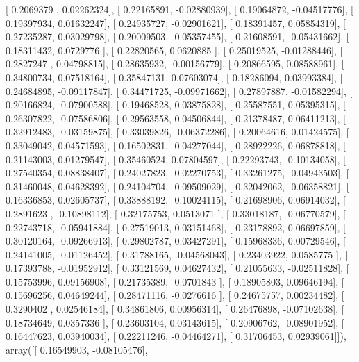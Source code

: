 \documentclass{article}
\begin{document}
       [ 0.2069379 ,  0.02262324],
       [ 0.22165891, -0.02880939],
       [ 0.19064872, -0.04517776],
       [ 0.19397934,  0.01632247],
       [ 0.24935727, -0.02901621],
       [ 0.18391457,  0.05854319],
       [ 0.27235287,  0.03029798],
       [ 0.20009503, -0.05357455],
       [ 0.21608591, -0.05431662],
       [ 0.18311432,  0.0729776 ],
       [ 0.22820565,  0.0620885 ],
       [ 0.25019525, -0.01288446],
       [ 0.2827247 ,  0.04798815],
       [ 0.28635932, -0.00156779],
       [ 0.20866595,  0.08588961],
       [ 0.34800734,  0.07518164],
       [ 0.35847131,  0.07603074],
       [ 0.18286094,  0.03993384],
       [ 0.24684895, -0.09117847],
       [ 0.34471725, -0.09971662],
       [ 0.27897887, -0.01582294],
       [ 0.20166824, -0.07900588],
       [ 0.19468528,  0.03875828],
       [ 0.25587551,  0.05395315],
       [ 0.26307822, -0.07586806],
       [ 0.29563558,  0.04506844],
       [ 0.21378487,  0.06411213],
       [ 0.32912483, -0.03159875],
       [ 0.33039826, -0.06372286],
       [ 0.20064616,  0.01424575],
       [ 0.33049042,  0.04571593],
       [ 0.16502831, -0.04277044],
       [ 0.28922226,  0.06878818],
       [ 0.21143003,  0.01279547],
       [ 0.35460524,  0.07804597],
       [ 0.22293743, -0.10134058],
       [ 0.27540354,  0.08838407],
       [ 0.24027823, -0.02270753],
       [ 0.33261275, -0.04943503],
       [ 0.31460048,  0.04628392],
       [ 0.24104704, -0.09509029],
       [ 0.32042062, -0.06358821],
       [ 0.16336853,  0.02605737],
       [ 0.33888192, -0.10024115],
       [ 0.21698906,  0.06914032],
       [ 0.2891623 , -0.10898112],
       [ 0.32175753,  0.0513071 ],
       [ 0.33018187, -0.06770579],
       [ 0.22743718, -0.05941884],
       [ 0.27519013,  0.03151468],
       [ 0.23178892,  0.06697859],
       [ 0.30120164, -0.09266913],
       [ 0.29802787,  0.03427291],
       [ 0.15968336,  0.00729546],
       [ 0.24141005, -0.01126452],
       [ 0.31788165, -0.04568043],
       [ 0.23403922,  0.0585775 ],
       [ 0.17393788, -0.01952912],
       [ 0.33121569,  0.04627432],
       [ 0.21055633, -0.02511828],
       [ 0.15753996,  0.09156908],
       [ 0.21735389, -0.0701843 ],
       [ 0.18905803,  0.09646194],
       [ 0.15696256,  0.04649244],
       [ 0.28471116, -0.0276616 ],
       [ 0.24675757,  0.00234482],
       [ 0.3290402 ,  0.02546184],
       [ 0.34861806,  0.00956314],
       [ 0.26476898, -0.07102638],
       [ 0.18734649,  0.0357336 ],
       [ 0.23603104,  0.03143615],
       [ 0.20906762, -0.08901952],
       [ 0.16447623,  0.03940034],
       [ 0.22211246, -0.04464271],
       [ 0.31706453,  0.02939061]]), array([[ 0.16549903, -0.08105476],
\end{document}
